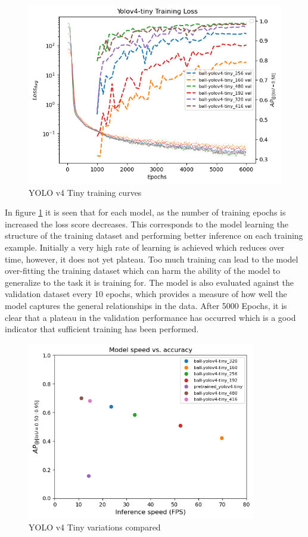 \documentclass[a4paper,twoside,12pt]{report}
\begin{document}
\begin{figure}[h!]
\begin{center}
\includegraphics[width=13cm]{images/yolov4tiny_train.png}
\caption{YOLO v4 Tiny training curves}
\label{fig:yolov4tiny_train}
\end{center}
\end{figure}

In figure \ref{fig:yolov4tiny_train} it is seen that for each model, as the number of training epochs is increased the loss score decreases. This corresponds to the model learning the structure of the training dataset and performing better inference on each training example. Initially a very high rate of learning is achieved which reduces over time, however, it does not yet plateau. Too much training can lead to the model over-fitting the training dataset which can harm the ability of the model to generalize to the task it is training for. The model is also evaluated against the validation dataset every 10 epochs, which provides a measure of how well the model captures the general relationships in the data. After 5000 Epochs, it is clear that a plateau in the validation performance has occurred which is a good indicator that sufficient training has been performed. 

\begin{figure}[h!]
\begin{center}
\includegraphics[width=10cm]{images/yolov4tiny_compare.png}
\caption{YOLO v4 Tiny variations compared}
\label{fig:yolov4tiny_compare}
\end{center}
\end{figure}
\end{document}
